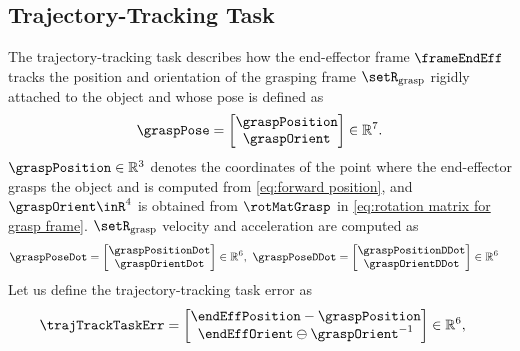 	\subsection{Trajectory-Tracking Task}\label{subsec-chap4:trajectory tracking}
	The trajectory-tracking task describes how the end-effector frame $\frameEndEff$ tracks the position and orientation of the grasping frame $\setR_{\rm grasp}$
	rigidly attached to the object and whose pose is defined as 
	\begin{equation}
		\graspPose = \begin{bmatrix}
			\graspPosition \\ \graspOrient
		\end{bmatrix}\in\mathbb{R}^7.
	\end{equation}
	 $\graspPosition\in\mathbb{R}^3$ denotes the coordinates of the point where the end-effector grasps the object and  is computed from \cref{eq:forward position}, and $\graspOrient\inR^4$ is obtained from $\rotMatGrasp$ in \cref{eq:rotation matrix for grasp frame}. $\setR_{\rm grasp}$ velocity and acceleration are computed as 
	\begin{align}\label{eq:grasp vel and acc}
		\graspPoseDot&=\begin{bmatrix}
			\graspPositionDot \\ \graspOrientDot
		\end{bmatrix}\in \mathbb{R}^6, \
		\graspPoseDDot=\begin{bmatrix}
			\graspPositionDDot \\ \graspOrientDDot
		\end{bmatrix}\in \mathbb{R}^6
	\end{align}
	Let us define the trajectory-tracking task error as 
	\begin{align}\label{eq:grajectory tracking error}
		\trajTrackTaskErr &= 
		\begin{bmatrix}
			\endEffPosition -\graspPosition \\ \endEffOrient \ominus \graspOrient^{-1}
		\end{bmatrix}\in \mathbb{R}^{6},
	\end{align}
